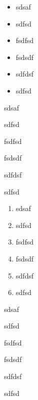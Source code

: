 \documentclass[12pt,ngerman]{scrartcl}
\begin{document}
\begin{itemize}
	\item sdsaf
	\item sdfsd
	\item fsdfsd
	\item fsdsdf
	\item sdfdsf
	\item sdfsd
\end{itemize}

\begin{compactitem}
	\item sdsaf
	\item sdfsd
	\item fsdfsd
	\item fsdsdf
	\item sdfdsf
	\item sdfsd
\end{compactitem}

\begin{enumerate}
	\item sdsaf
	\item sdfsd
	\item fsdfsd
	\item fsdsdf
	\item sdfdsf
	\item sdfsd
\end{enumerate}

\begin{compactenum}
	\item sdsaf
	\item sdfsd
	\item fsdfsd
	\item fsdsdf
	\item sdfdsf
	\item sdfsd
\end{compactenum}
\end{document}
